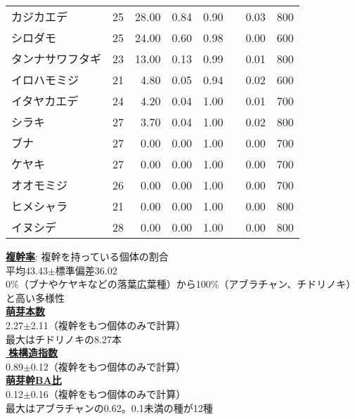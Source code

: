 \documentclass[a0, 30pt, plainboxedsections]{sciposter} %
\begin{document}
\begin{multicols}{2}
\begin{mdframed}[style=subsection.frame,frametitle={\textbf{\LARGE{\ding{192}}\Large{25種の株構造は種間で大きく異なる}}}]
\begin{wraptable}{r}{15.3em}
{\begin{tabular}{llrrrrl}
\rowcolor{Orange1!30}カジカエデ &  25 & 28.00 & 0.84 & 0.90 & 0.03  & 800 \\ 
\rowcolor{Blue2!80}シロダモ &  25 & 24.00 & 0.60 & 0.98 & 0.00  & 600 \\ 
\rowcolor{Orange1!30}タンナサワフタギ &  23 & 13.00 & 0.13 & 0.99 & 0.01  & 800 \\ 
\rowcolor{Orange1!30}イロハモミジ &  21 & 4.80 & 0.05 & 0.94 & 0.02  & 600 \\ 
\rowcolor{Orange1!30}イタヤカエデ &  24 & 4.20 & 0.04 & 1.00 & 0.01  & 700 \\ 
\rowcolor{Orange1!30}シラキ &  27 & 3.70 & 0.04 & 1.00 & 0.02 & 800 \\ 
\rowcolor{Orange1!30}ブナ &  27 & 0.00 & 0.00 & 1.00 & 0.00 & 700 \\ 
\rowcolor{Orange1!30}ケヤキ &  27 & 0.00 & 0.00 & 1.00 & 0.00 & 700 \\ 
\rowcolor{Orange1!30}オオモミジ &  26 & 0.00 & 0.00 & 1.00 & 0.00 & 700 \\ 
\rowcolor{Orange1!30}ヒメシャラ &  21 & 0.00 & 0.00 & 1.00 & 0.00 & 800 \\ 
\rowcolor{Orange1!30}イヌシデ &  28 & 0.00 & 0.00 & 1.00 & 0.00　 & 800 \\ 
   \hline
\end{tabular}}
\end{wraptable}

\textbf{\underline{複幹率}}{\footnotesize: 複幹を持っている個体の割合}\\平均43.43$\pm$標準偏差36.02\\
{\scriptsize 0\%（ブナやケヤキなどの落葉広葉種）から100\%（アブラチャン、チドリノキ）と高い多様性}\\
\textbf{\underline{萌芽本数}}\\2.27$\pm$2.11{\footnotesize（複幹をもつ個体のみで計算）}\\
{\scriptsize 最大はチドリノキの8.27本}\\
\textbf{\underline{株構造指数}}\\0.89$\pm$0.12{\footnotesize（複幹をもつ個体のみで計算）}\\
\textbf{\underline{萌芽幹BA比}}\\0.12$\pm$0.16{\footnotesize（複幹をもつ個体のみで計算）}\\
{\scriptsize 最大はアブラチャンの0.62。0.1未満の種が12種}

\vspace{2em}

\end{mdframed}


\end{multicols}
\end{document}
